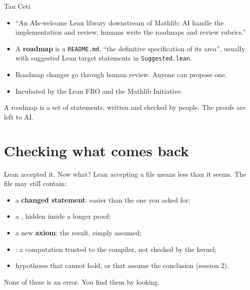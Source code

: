 \documentclass[10pt, aspectratio=169]{beamer}
\begin{document}
\begin{frame}[fragile]{Tau Ceti}
\begin{itemize}
\item ``An AIs-welcome Lean library downstream of Mathlib: AI handle the implementation and review, humans write the roadmaps and review rubrics.''
\item A \textbf{roadmap} is a \texttt{README.md}, ``the definitive specification of its area'', usually with suggested Lean target statements in \texttt{Suggested.lean}.
\item Roadmap changes go through human review. Anyone can propose one.
\item Incubated by the Lean FRO and the Mathlib Initiative.
\end{itemize}

\vspace{0.4em}
\begin{keypoint}
\normalsize A roadmap is a set of statements, written and checked by people. The proofs are left to AI.
\end{keypoint}

\end{frame}

\section{Checking what comes back}

\begin{frame}[fragile]{Lean accepted it. Now what?}
Lean accepting a file means less than it seems. The file may still contain:
\begin{itemize}
\item a \textbf{changed statement}: easier than the one you asked for;
\item a , hidden inside a longer proof;
\item a new \textbf{axiom}: the result, simply assumed;
\item {}: a computation trusted to the compiler, not checked by the kernel;
\item hypotheses that cannot hold, or that assume the conclusion (session 2).
\end{itemize}

\vspace{0.6em}
\begin{keypoint}
\normalsize None of these is an error. You find them by looking.
\end{keypoint}
\end{frame}
\end{document}
